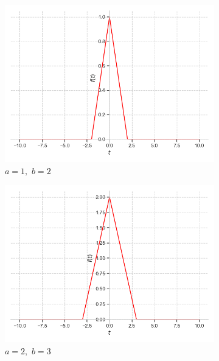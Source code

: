\documentclass[a4paper, 16pt]{article}
\begin{document}
    \begin{figure}[htbp]
        \centering
        \begin{subfigure}{0.3\textwidth}
            \centering
            \includegraphics[width=\linewidth]{trif_a=1_b=2.png}
            \caption{$a=1,\,\,b=2$}
            \label{fig:triangf_1}
        \end{subfigure}
        \hfill
        \begin{subfigure}{0.3\textwidth}
            \centering
            \includegraphics[width=\linewidth]{trif_a=2_b=3.png}
            \caption{$a=2,\,\,b=3$}
            \label{fig:triangf_2}
        \end{subfigure}
        \hfill
        \begin{subfigure}{0.3\textwidth}

\end{subfigure}
\end{figure}
\end{document}
